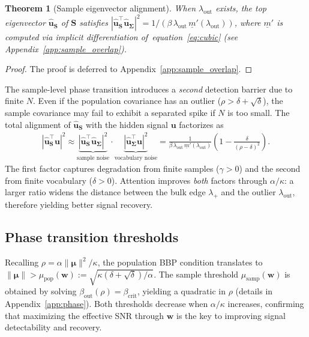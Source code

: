 \documentclass{article}
\def\eqref#1{equation~\ref{#1}}
\def\vmu{{\bm{\mu}}}
\def\vu{{\bm{u}}}
\def\vw{{\bm{w}}}
\def\mS{{\bm{S}}}
\def\mSigma{{\bm{\Sigma}}}
\newtheorem{theorem}{Theorem}
\begin{document}
\begin{theorem}[Sample eigenvector alignment]\label{thm:sample_overlap}
    When $\lambda_\mathrm{out}$ exists, the top eigenvector $\hat\vu_\mS$ of $\mS$ satisfies
    $|\hat\vu_\mS^\top \hat\vu_\mSigma|^2 = 1/(\beta\,\lambda_\mathrm{out}\,\underline{m}'(\lambda_\mathrm{out}))$,
    where $\underline{m}'$ is computed via implicit differentiation of~\eqref{eq:cubic} (see Appendix~\ref{app:sample_overlap}).
\end{theorem}
\begin{proof}
The proof is deferred to Appendix~\ref{app:sample_overlap}.
\end{proof}

The sample-level phase transition introduces a \emph{second} detection barrier due to finite $N$. Even if the population covariance has an outlier ($\rho > \delta + \sqrt{\delta}$), the sample covariance may fail to exhibit a separated spike if $N$ is too small. The total alignment of $\hat\vu_\mS$ with the hidden signal $\vu$ factorizes as
\begin{align}\label{eq:total_alignment}
    |\hat\vu_\mS^\top \vu|^2 \approx \underbrace{|\hat\vu_\mS^\top \hat\vu_\mSigma|^2}_{\text{sample noise}} \cdot \underbrace{|\hat\vu_\mSigma^\top \vu|^2}_{\text{vocabulary noise}} = \frac{1}{\beta\,\lambda_\mathrm{out}\,\underline{m}'(\lambda_\mathrm{out})} \left(1 - \frac{\delta}{(\rho - \delta)^2}\right).
\end{align}
The first factor captures degradation from finite samples ($\gamma > 0$) and the second from finite vocabulary ($\delta > 0$). Attention improves \emph{both} factors through $\alpha/\kappa$: a larger ratio widens the distance between the bulk edge $\lambda_+$ and the outlier $\lambda_{\text{out}}$, therefore yielding better signal recovery.

\subsection{Phase transition thresholds}\label{sec:phase}
Recalling $\rho = \alpha\|\vmu\|^2/\kappa$, the population BBP condition translates to $\|\vmu\| > \mu_\mathrm{pop}(\vw) := \sqrt{\kappa(\delta + \sqrt{\delta})/\alpha}$. The sample threshold $\mu_\mathrm{samp}(\vw)$ is obtained by solving $\beta_\mathrm{out}(\rho) = \beta_\mathrm{crit}$, yielding a quadratic in $\rho$ (details in Appendix~\ref{app:phase}). Both thresholds decrease when $\alpha/\kappa$ increases, confirming that maximizing the effective SNR through $\vw$ is the key to improving signal detectability and recovery.
\end{document}
